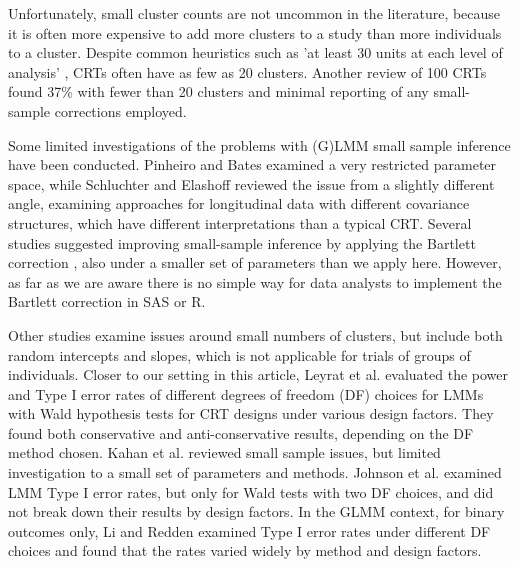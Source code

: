 \documentclass[twocolumn]{bmcart}%
\begin{document}
Unfortunately, small cluster counts are not uncommon in the literature, because it is often more expensive to add more clusters to a study than more individuals to a cluster. Despite common heuristics such as 'at least 30 units at each level of analysis' \cite{kreft_introducing_1998}, CRTs often have as few as 20 clusters. Another review of 100 CRTs \cite{kahan_increased_2016} found 37\% with fewer than 20 clusters and minimal reporting of any small-sample corrections employed.

Some limited investigations of the problems with (G)LMM small sample inference have been conducted. Pinheiro and Bates \cite{pinheiro_mixed-effects_2009} examined a very restricted parameter space, while Schluchter and Elashoff \cite{schluchter_small-sample_1990} reviewed the issue from a slightly different angle, examining approaches for longitudinal data with different covariance structures, which have different interpretations than a typical CRT. Several studies \cite{zucker_improved_2000, melo_improved_2009, manor_small_2004, stein_alternatives_2014} suggested improving small-sample inference by applying the Bartlett correction \cite{bartlett_properties_1937}, also under a smaller set of parameters than we apply here. However, as far as we are aware there is no simple way for data analysts to implement the Bartlett correction in SAS or R.  

Other studies \cite{luke_evaluating_2017, maas_sufficient_2005, bell_dancing_2010} examine issues around small numbers of clusters, but include both random intercepts and slopes, which is not applicable for trials of groups of individuals. Closer to our setting in this article, Leyrat et al. \cite{leyrat_cluster_2018} evaluated the power and Type I error rates of different degrees of freedom (DF) choices for LMMs with Wald hypothesis tests for CRT designs under various design factors. They found both conservative and anti-conservative results, depending on the DF method chosen. Kahan et al. \cite{kahan_increased_2016} reviewed small sample issues, but limited investigation to a small set of parameters and methods. Johnson et al. \cite{johnson_recommendations_2015} examined LMM Type I error rates, but only for Wald tests with two DF choices, and did not break down their results by design factors. In the GLMM context, for binary outcomes only, Li and Redden \cite{li_comparing_2015} examined Type I error rates under different DF choices and found that the rates varied widely by method and design factors.
\end{document}
